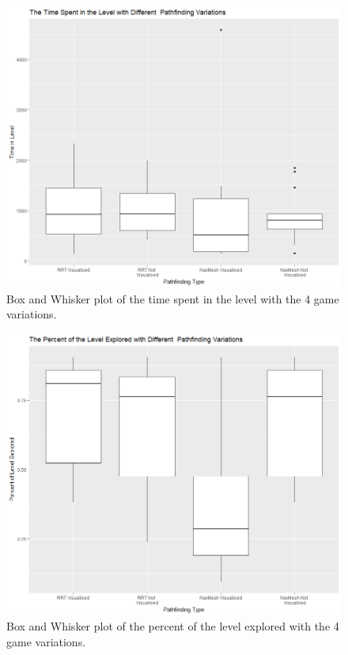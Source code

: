 \documentclass[journal]{IEEEtran}
\begin{document}
	\begin{figure}[h]
		\includegraphics[width=1.0\linewidth]{GraphTime.png}
		\caption{Box and Whisker plot of the time spent in the level with the 4 game variations.}
		\label{graph:Time}
	\end{figure}  
	
	\begin{figure}[h]
		\includegraphics[width=1.0\linewidth]{GraphPercent.png}
		\caption{Box and Whisker plot of the percent of the level explored with the 4 game variations.}
		\label{graph:Percent}
	\end{figure}
	
\end{document}
